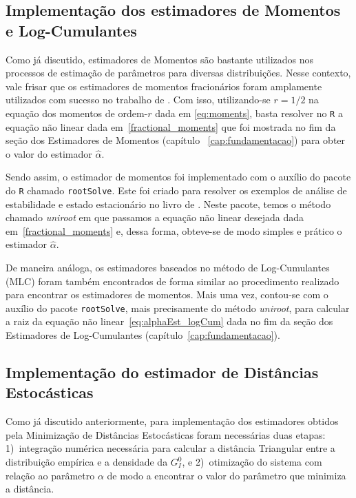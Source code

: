 \subsection{Implementação dos estimadores de Momentos e Log-Cumulantes}

Como já discutido, estimadores de Momentos são bastante utilizados nos processos de estimação de parâmetros para diversas distribuições. Nesse contexto, vale frisar que os estimadores de momentos fracionários foram amplamente utilizados com sucesso no trabalho de \citet{Clutter1997}. 
Com isso, utilizando-se $r = 1/2$ na equação dos momentos de ordem-$r$ dada em \eqref{eq:moments}, basta resolver no \texttt{R} a equação não linear dada em~\eqref{fractional_moments} que foi mostrada no fim da seção dos Estimadores de Momentos (capítulo ~\ref{cap:fundamentacao}) para obter o valor do estimador $\widehat{\alpha}$.

Sendo assim, o estimador de momentos foi implementado com o auxílio do pacote do \texttt{R} chamado \texttt{rootSolve}. 
Este foi criado para resolver os exemplos de análise de estabilidade e estado estacionário no livro de \citet{Soetaert2009}. Neste pacote, temos o método chamado \textit{uniroot} em que passamos a equação não linear desejada dada em~\eqref{fractional_moments} e, dessa forma, obteve-se de modo simples e prático o estimador $\widehat{\alpha}$.

De maneira análoga, os estimadores baseados no método de Log-Cumulantes (MLC) foram também encontrados de forma similar ao procedimento realizado para encontrar os estimadores de momentos. 
Mais uma vez, contou-se com o auxílio do pacote \texttt{rootSolve}, mais precisamente do método \emph{uniroot}, para calcular a raiz da equação não linear~\eqref{eq:alphaEst_logCum} dada no fim da seção dos Estimadores de Log-Cumulantes (capítulo~\ref{cap:fundamentacao}).

\subsection{Implementação do estimador de Distâncias Estocásticas}

Como já discutido anteriormente, para implementação dos estimadores obtidos pela Minimização de Distâncias Estocásticas foram necessárias duas etapas: 
1)~integração numérica necessária para calcular a distância Triangular entre a distribuição empírica e a densidade da $G_I^0$, e 
2)~otimização do sistema com relação ao parâmetro $\alpha$ de modo a encontrar o valor do parâmetro que minimiza a distância.

